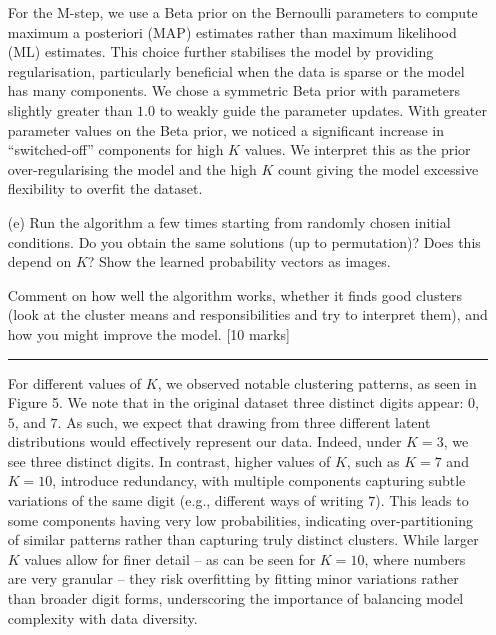 \documentclass{article}
\begin{document}
\begin{enumerate}
    For the M-step, we use a Beta prior on the Bernoulli parameters to compute maximum a posteriori (MAP) estimates rather than maximum likelihood (ML) estimates. This choice further stabilises the model by providing regularisation, particularly beneficial when the data is sparse or the model has many components. We chose a symmetric Beta prior with parameters slightly greater than $1.0$ to weakly guide the parameter updates. With greater parameter values on the Beta prior, we noticed a significant increase in “switched-off” components for high $K$ values. We interpret this as the prior over-regularising the model and the high $K$ count giving the model excessive flexibility to overfit the dataset.

    \vspace{10pt}


    \item[(e)] Run the algorithm a few times starting from randomly chosen initial conditions. Do you obtain the same solutions (up to permutation)? Does this depend on \( K \)? Show the learned probability vectors as images.

    Comment on how well the algorithm works, whether it finds good clusters (look at the cluster means and responsibilities and try to interpret them), and how you might improve the model. [10 marks]

    \noindent\textcolor{gray}{\rule{0.1\linewidth}{0.4pt}}
    \vspace{10pt}

     For different values of $K$, we observed notable clustering patterns, as seen in Figure 5. We note that in the original dataset three distinct digits appear: $0$, $5$, and $7$. As such, we expect that drawing from three different latent distributions would effectively represent our data. Indeed, under $K=3$, we see three distinct digits. In contrast, higher values of $K$, such as $K=7$ and $K=10$, introduce redundancy, with multiple components capturing subtle variations of the same digit (e.g., different ways of writing $7$). This leads to some components having very low probabilities, indicating over-partitioning of similar patterns rather than capturing truly distinct clusters. While larger $K$ values allow for finer detail – as can be seen for $K=10$, where numbers are very granular – they risk overfitting by fitting minor variations rather than broader digit forms, underscoring the importance of balancing model complexity with data diversity.

    \vspace{0.8em}


\end{enumerate}
\end{document}
